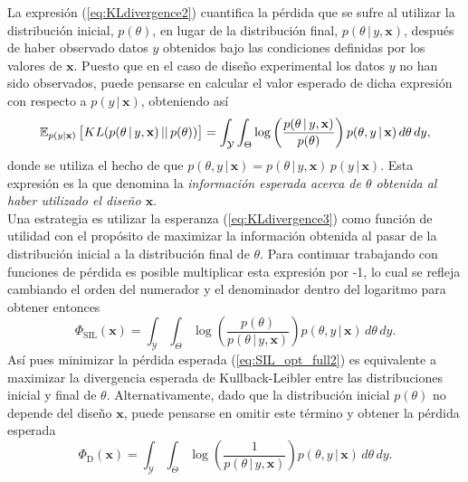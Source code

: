 La expresión (\ref{eq:KLdivergence2}) cuantifica la pérdida que se sufre al utilizar la distribución inicial, $p(\theta)$, en lugar de la distribución final, $p(\theta \, | \, y, \mathbf{x})$, después de haber observado datos $y$ obtenidos bajo las condiciones definidas por los valores de $\mathbf{x}$. Puesto que en el caso de diseño experimental los datos $y$ no han sido observados, puede pensarse en calcular el valor esperado de dicha expresión con respecto a $p(y \, | \, \mathbf{x})$, obteniendo así
\begin{equation} \label{eq:KLdivergence3}
	\mathbb{E}_{p(y | \mathbf{x})} \left[ KL(p(\theta \, | \, y, \mathbf{x}) \, || \, p(\theta)) \right] = \int_{\mathcal{Y}} \int_{\Theta} \log \left( \frac{p(\theta \, | \, y, \mathbf{x})}{p(\theta)} \right) p( \theta, y \, | \, \mathbf{x} ) \,d\theta \, dy,
\end{equation}
donde se utiliza el hecho de que $p( \theta, y \, | \, \mathbf{x} ) = p( \theta \, | \, y, \mathbf{x} ) \, p(y \, | \, \mathbf{x})$. Esta expresión es la que \cite{bernardo_informationasutility} denomina la \textit{información esperada acerca de $\theta$ obtenida al haber utilizado el diseño $\mathbf{x}$}. \\


Una estrategia es utilizar la esperanza (\ref{eq:KLdivergence3}) como función de utilidad con el propósito de maximizar la información obtenida al pasar de la distribución inicial a la distribución final de $\theta$. Para continuar trabajando con funciones de pérdida es posible multiplicar esta expresión por -1, lo cual se refleja cambiando el orden del numerador y el denominador dentro del logaritmo para obtener entonces
\begin{equation} \label{eq:SIL_opt_full2}
	\Phi_{\text{SIL}} (\mathbf{x}) = \int_{\mathcal{Y}} \int_{\Theta} \log \left( \frac{p(\theta )}{p(\theta \, | \, y, \mathbf{x})} \right) p( \theta, y \, | \, \mathbf{x} ) \,d\theta \,dy.
\end{equation}
Así pues minimizar la pérdida esperada (\ref{eq:SIL_opt_full2}) es equivalente a maximizar la divergencia esperada de Kullback-Leibler entre las distribuciones inicial y final de $\theta$. Alternativamente, dado que la distribución inicial $p(\theta)$ no depende del diseño $\mathbf{x}$, puede pensarse en omitir este término y obtener la pérdida esperada
\begin{equation} \label{eq:D_opt_full2}
	\Phi_{\text{D}} (\mathbf{x}) = \int_{\mathcal{Y}} \int_{\Theta} \log \left( \frac{1}{p(\theta \, | \, y, \mathbf{x})} \right) p( \theta, y \, | \, \mathbf{x} ) \,d\theta \,dy.
\end{equation}

